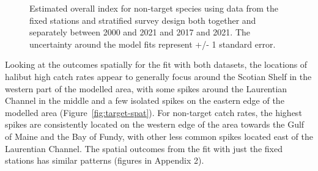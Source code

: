 \documentclass[12pt]{article}\usepackage[]{graphicx}\usepackage[]{color}
\begin{document}
\begin{figure}[htb]

{\centering {}  

}

\caption{Estimated overall index for non-target species using data from the fixed stations and stratified survey design both together and separately between 2000 and 2021 and 2017 and 2021. The uncertainty around the model fits represent +/- 1 standard error.}\label{fig:non-t-indices}
\end{figure}
Looking at the outcomes spatially for the fit with both datasets, the locations of halibut high catch rates appear to generally focus around the Scotian Shelf in the western part of the modelled area, with some spikes around the Laurentian Channel in the middle and a few isolated spikes on the eastern edge of the modelled area (Figure~\ref{fig:target-spat}). For non-target catch rates, the highest spikes are consistently located on the western edge of the area towards the Gulf of Maine and the Bay of Fundy, with other less common spikes located east of the Laurentian Channel. The spatial outcomes from the fit with just the fixed stations has similar patterns (figures in Appendix 2).
\end{document}
